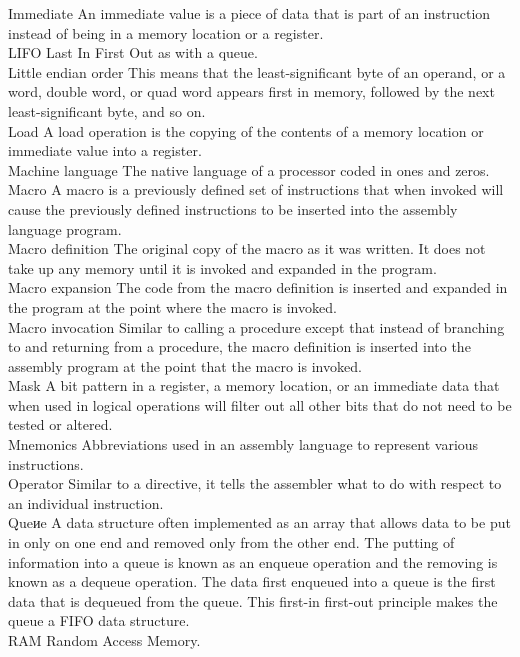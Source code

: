 \documentclass[10pt]{article}
\begin{document}
Immediate An immediate value is a piece of data that is part of an instruction instead of being in a memory location or a register.\\
LIFO Last In First Out as with a queue.\\
Little endian order This means that the least-significant byte of an operand, or a word, double word, or quad word appears first in memory, followed by the next least-significant byte, and so on.\\
Load A load operation is the copying of the contents of a memory location or immediate value into a register.\\
Machine language The native language of a processor coded in ones and zeros.\\
Macro A macro is a previously defined set of instructions that when invoked will cause the previously defined instructions to be inserted into the assembly language program.\\
Macro definition The original copy of the macro as it was written. It does not take up any memory until it is invoked and expanded in the program.\\
Macro expansion The code from the macro definition is inserted and expanded in the program at the point where the macro is invoked.\\
Macro invocation Similar to calling a procedure except that instead of branching to and returning from a procedure, the macro definition is inserted into the assembly program at the point that the macro is invoked.\\
Mask A bit pattern in a register, a memory location, or an immediate data that when used in logical operations will filter out all other bits that do not need to be tested or altered.\\
Mnemonics Abbreviations used in an assembly language to represent various instructions.\\
Operator Similar to a directive, it tells the assembler what to do with respect to an individual instruction.\\
Queиe A data structure often implemented as an array that allows data to be put in only on one end and removed only from the other end. The putting of information into a queue is known as an enqueue operation and the removing is known as a dequeue operation. The data first enqueued into a queue is the first data that is dequeued from the queue. This first-in first-out principle makes the queue a FIFO data structure.\\
RAM Random Access Memory.\\
\end{document}
